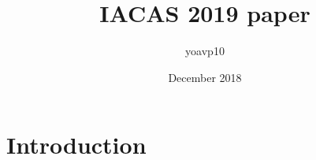 \documentclass{article}
\title{IACAS 2019 paper}
\author{yoavp10 }
\date{December 2018}
\begin{document}
\maketitle

\section{Introduction}
\end{document}
